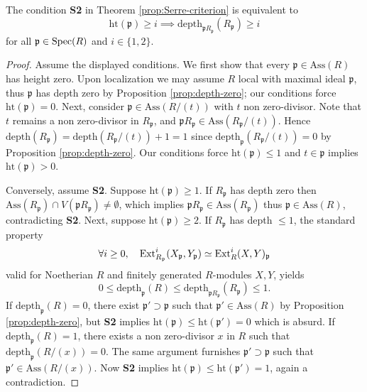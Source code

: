 \begin{proposition}\label{prop:S2}
	The condition \textbf{S2} in Theorem \ref{prop:Serre-criterion} is equivalent to
	\[ \mathrm{ht}(\mathfrak{p}) \geq i \implies \mathrm{depth}_{\mathfrak{p}R_{\mathfrak{p}}}(R_{\mathfrak{p}}) \geq i \]
	for all $\mathfrak{p} \in \operatorname{Spec}(R)$ and $i \in \{1,2\}$.
\end{proposition}
\begin{proof}
	Assume the displayed conditions. We first show that every $\mathfrak{p} \in \text{Ass}(R)$ has height zero. Upon localization we may assume $R$ local with maximal ideal $\mathfrak{p}$, thus $\mathfrak{p}$ has depth zero by Proposition \ref{prop:depth-zero}; our conditions force $\text{ht}(\mathfrak{p})=0$. Next, consider $\mathfrak{p} \in \text{Ass}(R/(t))$ with $t$ non zero-divisor. Note that $t$ remains a non zero-divisor in $R_{\mathfrak{p}}$, and $\mathfrak{p}R_{\mathfrak{p}} \in \text{Ass}(R_{\mathfrak{p}}/(t))$. Hence $\text{depth}(R_{\mathfrak{p}}) = \text{depth}(R_{\mathfrak{p}}/(t)) + 1 = 1$ since $\text{depth}_{\mathfrak{p}}(R_{\mathfrak{p}}/(t)) = 0$ by Proposition \ref{prop:depth-zero}. Our conditions force $\text{ht}(\mathfrak{p}) \leq 1$ and $t \in \mathfrak{p}$ implies $\text{ht}(\mathfrak{p}) > 0$.
	
	Conversely, assume \textbf{S2}. Suppose $\text{ht}(\mathfrak{p}) \geq 1$. If $R_{\mathfrak{p}}$ has depth zero then $\text{Ass}(R_{\mathfrak{p}}) \cap V(\mathfrak{p}R_{\mathfrak{p}}) \neq \emptyset$, which implies $\mathfrak{p}R_{\mathfrak{p}} \in \text{Ass}(R_{\mathfrak{p}})$ thus $\mathfrak{p} \in \text{Ass}(R)$, contradicting \textbf{S2}. Next, suppose $\text{ht}(\mathfrak{p}) \geq 2$. If $R_{\mathfrak{p}}$ has depth $\leq 1$, the standard property
	\[ \forall i \geq 0, \quad \operatorname{Ext}^i_{R_{\mathfrak{p}}}(X_{\mathfrak{p}}, Y_{\mathfrak{p}}) \simeq \operatorname{Ext}^i_R(X,Y)_{\mathfrak{p}} \]
	valid for Noetherian $R$ and finitely generated $R$-modules $X, Y$, yields
	\[ 0 \leq \text{depth}_{\mathfrak{p}}(R) \leq \text{depth}_{\mathfrak{p}R_{\mathfrak{p}}}(R_{\mathfrak{p}}) \leq 1. \]
	If $\text{depth}_{\mathfrak{p}}(R)=0$, there exist $\mathfrak{p}' \supset \mathfrak{p}$ such that $\mathfrak{p}' \in \text{Ass}(R)$ by Proposition \ref{prop:depth-zero}, but \textbf{S2} implies $\text{ht}(\mathfrak{p}) \leq \text{ht}(\mathfrak{p}') = 0$ which is absurd. If $\text{depth}_{\mathfrak{p}}(R)=1$, there exists a non zero-divisor $x$ in $R$ such that $\text{depth}_{\mathfrak{p}}(R/(x)) = 0$. The same argument furnishes $\mathfrak{p}' \supset \mathfrak{p}$ such that $\mathfrak{p}' \in \text{Ass}(R/(x))$. Now \textbf{S2} implies $\text{ht}(\mathfrak{p}) \leq \text{ht}(\mathfrak{p}')=1$, again a contradiction.
\end{proof}

